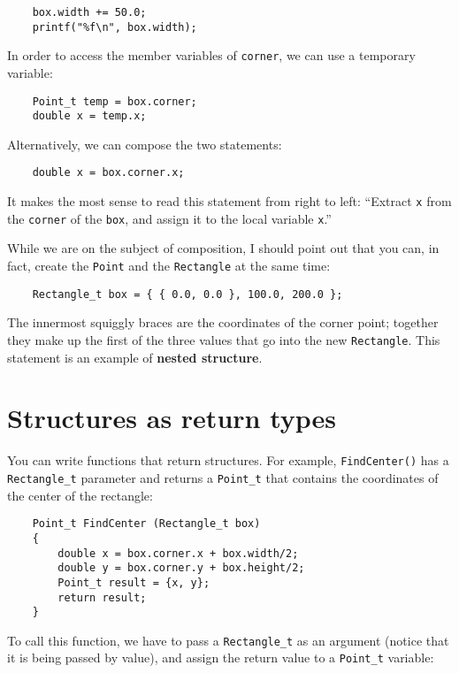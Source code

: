 \begin{verbatim}
	box.width += 50.0;
	printf("%f\n", box.width);
\end{verbatim}
%
In order to access the member variables of {\tt corner}, we can use a
temporary variable:

\begin{verbatim}
	Point_t temp = box.corner;
	double x = temp.x;
\end{verbatim}
%
Alternatively, we can compose the two statements:


\begin{verbatim}
	double x = box.corner.x;
\end{verbatim}
%
It makes the most sense to read this statement from right to
left: ``Extract {\tt x} from the {\tt corner} of the {\tt box},
and assign it to the local variable {\tt x}.''

While we are on the subject of composition, I should point
out that you can, in fact, create the {\tt Point} and the
{\tt Rectangle} at the same time:

\begin{verbatim}
	Rectangle_t box = { { 0.0, 0.0 }, 100.0, 200.0 };
\end{verbatim}
%
The innermost squiggly braces are the coordinates of the
corner point; together they make up the first of the three
values that go into the new {\tt Rectangle}.  This statement
is an example of {\bf nested structure}.



\section{Structures as return types}

You can write functions that return structures.  For example,
{\tt FindCenter()} has a {\tt Rectangle\_t} parameter and
returns a {\tt Point\_t} that contains the coordinates of the
center of the rectangle:

\begin{verbatim}
	Point_t FindCenter (Rectangle_t box)
	{
		double x = box.corner.x + box.width/2;
		double y = box.corner.y + box.height/2;
		Point_t result = {x, y};
		return result;
	}
\end{verbatim}
%
To call this function, we have to pass a {\tt Rectangle\_t} as an argument
(notice that it is being passed by value), and assign the
return value to a {\tt Point\_t} variable:

